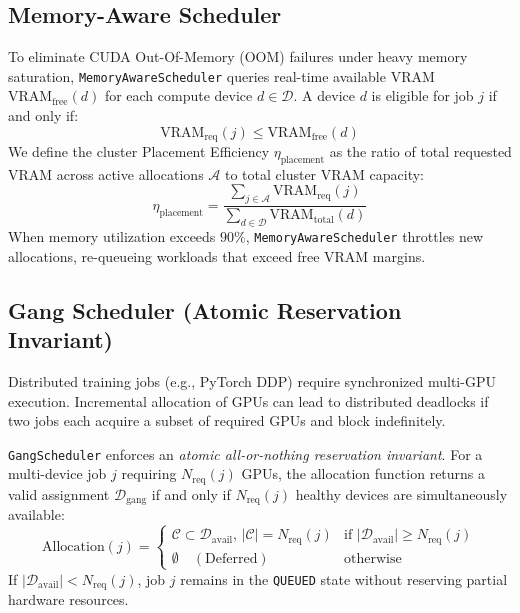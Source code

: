 \subsection{Memory-Aware Scheduler}
To eliminate CUDA Out-Of-Memory (OOM) failures under heavy memory saturation, \texttt{MemoryAwareScheduler} queries real-time available VRAM $\text{VRAM}_{\text{free}}(d)$ for each compute device $d \in \mathcal{D}$. A device $d$ is eligible for job $j$ if and only if:
\begin{equation}
    \text{VRAM}_{\text{req}}(j) \le \text{VRAM}_{\text{free}}(d)
\end{equation}
We define the cluster Placement Efficiency $\eta_{\text{placement}}$ as the ratio of total requested VRAM across active allocations $\mathcal{A}$ to total cluster VRAM capacity:
\begin{equation}
    \eta_{\text{placement}} = \frac{\sum_{j \in \mathcal{A}} \text{VRAM}_{\text{req}}(j)}{\sum_{d \in \mathcal{D}} \text{VRAM}_{\text{total}}(d)}
\end{equation}
When memory utilization exceeds $90\%$, \texttt{MemoryAwareScheduler} throttles new allocations, re-queueing workloads that exceed free VRAM margins.

\subsection{Gang Scheduler (Atomic Reservation Invariant)}
Distributed training jobs (e.g., PyTorch DDP) require synchronized multi-GPU execution. Incremental allocation of GPUs can lead to distributed deadlocks if two jobs each acquire a subset of required GPUs and block indefinitely.

\texttt{GangScheduler} enforces an \emph{atomic all-or-nothing reservation invariant}. For a multi-device job $j$ requiring $N_{\text{req}}(j)$ GPUs, the allocation function returns a valid assignment $\mathcal{D}_{\text{gang}}$ if and only if $N_{\text{req}}(j)$ healthy devices are simultaneously available:
\begin{equation}
    \text{Allocation}(j) = \begin{cases}
        \mathcal{C} \subset \mathcal{D}_{\text{avail}}, \, |\mathcal{C}| = N_{\text{req}}(j) & \text{if } |\mathcal{D}_{\text{avail}}| \ge N_{\text{req}}(j) \\
        \emptyset \quad (\text{Deferred}) & \text{otherwise}
    \end{cases}
\end{equation}
If $|\mathcal{D}_{\text{avail}}| < N_{\text{req}}(j)$, job $j$ remains in the \texttt{QUEUED} state without reserving partial hardware resources.

